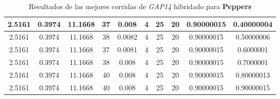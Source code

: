 \begin{table}[h!]
\begin{center}
\begin{tabular}{|c|c|c|c|c|c|c|c|c|c|}
        \hline
            2.5161 & 0.3974  & 11.1668 & 37 & 0.008 & 4 & 25 & 20 & 0.90000015 & 0.40000004\\
        \hline
        \hline
            2.5161 & 0.3974  & 11.1668 & 38 & 0.0082 & 4 & 25 & 20 & 0.90000015 & 0.50000006\\
        \hline
        \hline
            2.5161 & 0.3974  & 11.1668 & 37 & 0.0081 & 4 & 25 & 20 & 0.90000015 & 0.6000001\\
        \hline
        \hline
            2.5161 & 0.3974  & 11.1668 & 38 & 0.008 & 4 & 25 & 20 & 0.90000015 & 0.7000001\\
        \hline
        \hline
            2.5161 & 0.3974  & 11.1668 & 40 & 0.008 & 4 & 25 & 20 & 0.90000015 & 0.80000013\\
        \hline
        \hline
            2.5161 & 0.3974  & 11.1668 & 40 & 0.008 & 4 & 25 & 20 & 0.90000015 & 0.90000015\\
        \hline
        \end{tabular}
        \caption{Resultados de las mejores corridas de \emph{GAP14} hibridado para {\bf Peppers}}
        \label{tb:tableGAP14}
    \end{center}
\end{table}
